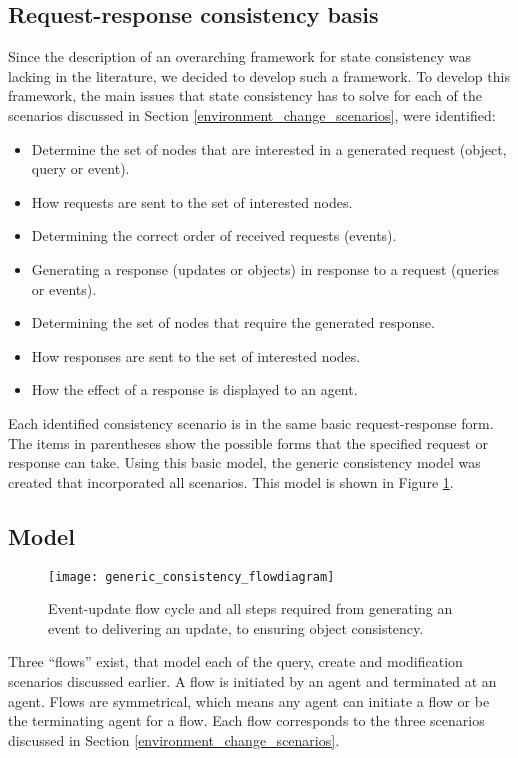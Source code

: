 \subsection{Request-response consistency basis}
Since the description of an overarching framework for state consistency was lacking in the literature, we decided to develop such a framework. To develop this framework, the main issues that state consistency has to solve for each of the scenarios discussed in Section \ref{environment_change_scenarios}, were identified:
%
\begin{itemize}
\item Determine the set of nodes that are interested in a generated request (object, query or event).
\item How requests are sent to the set of interested nodes.
\item Determining the correct order of received requests (events).
\item Generating a response (updates or objects) in response to a request (queries or events).
\item Determining the set of nodes that require the generated response.
\item How responses are sent to the set of interested nodes.
\item How the effect of a response is displayed to an agent.
\end{itemize}

Each identified consistency scenario is in the same basic request-response form. The items in parentheses show the possible forms that the specified request or response can take. Using this basic model, the generic consistency model was created that incorporated all scenarios. This model is shown in Figure \ref{fig_event_update_flowdiagram}.

\subsection{Model}

\begin{figure}[htbp]
 \centering
 \texttt{[image: generic\_consistency\_flowdiagram]}
 \caption{Event-update flow cycle and all steps required from generating an event to delivering an update, to ensuring object consistency.}
 \label{fig_event_update_flowdiagram}
\end{figure}

Three ``flows'' exist, that model each of the query, create and modification scenarios discussed earlier. A flow is initiated by an agent and terminated at an agent. Flows are symmetrical, which means any agent can initiate a flow or be the terminating agent for a flow. Each flow corresponds to the three scenarios discussed in Section \ref{environment_change_scenarios}.

